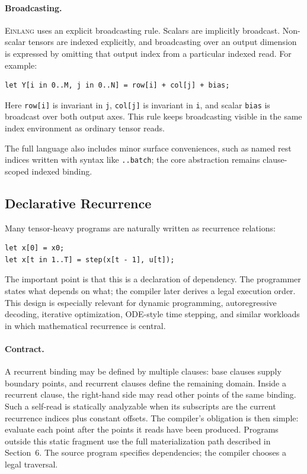 \documentclass[sigplan,screen,nonacm]{acmart}
\newcommand{\einlang}{\textsc{Einlang}}
\begin{document}
\paragraph{Broadcasting.}
\einlang{} uses an explicit broadcasting rule. Scalars are implicitly broadcast. Non-scalar tensors are indexed explicitly, and broadcasting over an output dimension is expressed by omitting that output index from a particular indexed read. For example:
\begin{lstlisting}[style=einlang]
let Y[i in 0..M, j in 0..N] = row[i] + col[j] + bias;
\end{lstlisting}
Here \texttt{row[i]} is invariant in \texttt{j}, \texttt{col[j]} is invariant in \texttt{i}, and scalar \texttt{bias} is broadcast over both output axes. This rule keeps broadcasting visible in the same index environment as ordinary tensor reads.

The full language also includes minor surface conveniences, such as named rest indices written with syntax like \texttt{..batch}; the core abstraction remains clause-scoped indexed binding.

\subsection{Declarative Recurrence}

Many tensor-heavy programs are naturally written as recurrence relations:

\begin{lstlisting}[style=einlang]
let x[0] = x0;
let x[t in 1..T] = step(x[t - 1], u[t]);
\end{lstlisting}

The important point is that this is a declaration of dependency. The programmer states what depends on what; the compiler later derives a legal execution order. This design is especially relevant for dynamic programming, autoregressive decoding, iterative optimization, ODE-style time stepping, and similar workloads in which mathematical recurrence is central.

\paragraph{Contract.}
A recurrent binding may be defined by multiple clauses: base clauses supply boundary points, and recurrent clauses define the remaining domain. Inside a recurrent clause, the right-hand side may read other points of the same binding. Such a self-read is statically analyzable when its subscripts are the current recurrence indices plus constant offsets. The compiler's obligation is then simple: evaluate each point after the points it reads have been produced. Programs outside this static fragment use the full materialization path described in Section~6. The source program specifies dependencies; the compiler chooses a legal traversal.
\end{document}
